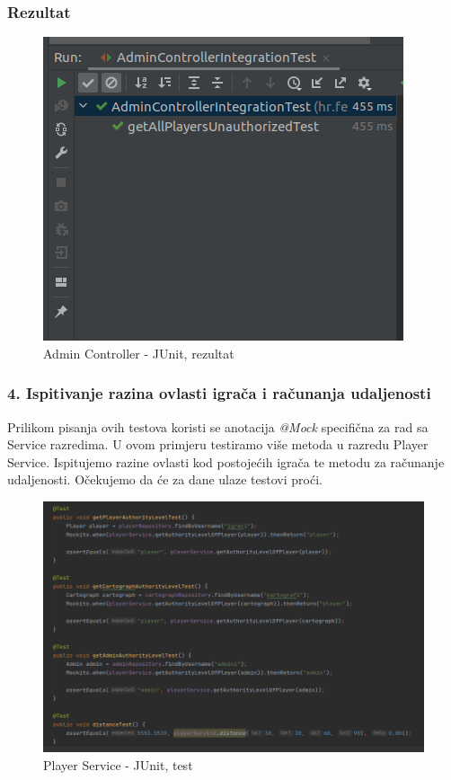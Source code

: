 				\subsubsection{Rezultat}
				
						\begin{figure}[H]
							\includegraphics[width=\textwidth]{slike/unauthorizedTest_result} 
							\centering
							\caption{Admin Controller - JUnit, rezultat}
							\label{}
						\end{figure}
			
			\subsubsection {4. Ispitivanje razina ovlasti igrača i računanja udaljenosti}
			
				{Prilikom pisanja ovih testova koristi se anotacija \textit{@Mock} specifična za rad sa Service razredima. U ovom primjeru testiramo više metoda u razredu Player Service. Ispitujemo razine ovlasti kod postojećih igrača te metodu za računanje udaljenosti. Očekujemo da će za dane ulaze testovi proći.}
			
					\begin{figure}[H]
						\includegraphics[width=\textwidth]{slike/playerServiceTest} 
						\centering
						\caption{Player Service - JUnit, test}
						\label{}
					\end{figure}
			
